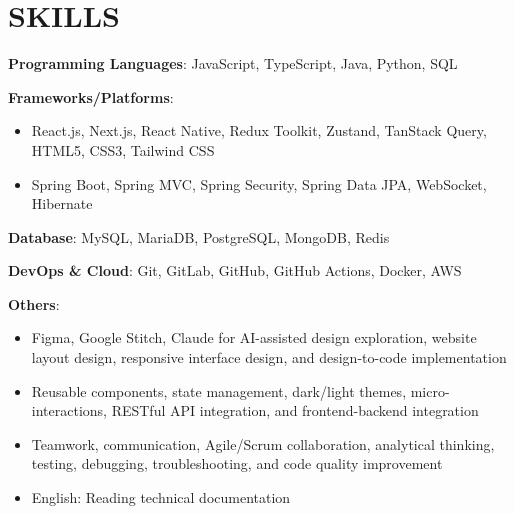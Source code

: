 \section{SKILLS}
\resumeSubHeadingListStart

  \item
    \resumeItemListStart
      \item \textbf{Programming Languages}: JavaScript, TypeScript, Java, Python, SQL
      \item \textbf{Frameworks/Platforms}:
        \begin{itemize}
          \item React.js, Next.js, React Native, Redux Toolkit, Zustand, TanStack Query, HTML5, CSS3, Tailwind CSS
          \item Spring Boot, Spring MVC, Spring Security, Spring Data JPA, WebSocket, Hibernate
        \end{itemize}
      \item \textbf{Database}: MySQL, MariaDB, PostgreSQL, MongoDB, Redis
      \item \textbf{DevOps \& Cloud}: Git, GitLab, GitHub, GitHub Actions, Docker, AWS
      \item \textbf{Others}:
        \begin{itemize}
          \item Figma, Google Stitch, Claude for AI-assisted design exploration, website layout design, responsive interface design, and design-to-code implementation
          \item Reusable components, state management, dark/light themes, micro-interactions, RESTful API integration, and frontend-backend integration
          \item Teamwork, communication, Agile/Scrum collaboration, analytical thinking, testing, debugging, troubleshooting, and code quality improvement
          \item English: Reading technical documentation
        \end{itemize}
    \resumeItemListEnd

\resumeSubHeadingListEnd
